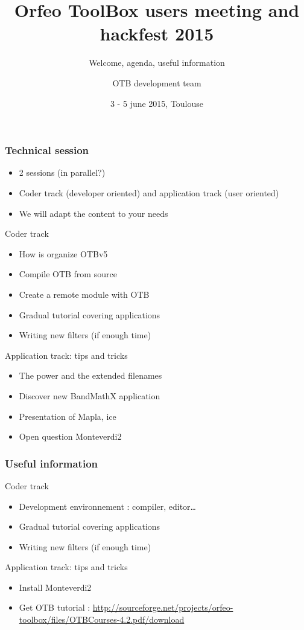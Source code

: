 \documentclass[8pt]{beamer}
\title{Orfeo ToolBox users meeting and hackfest 2015}
\subtitle{Welcome, agenda, useful information}
\author{OTB development team}%
\date{3 - 5 june 2015, Toulouse}
\begin{document}
\begin{frame}
\titlepage
\end{frame}

\begin{frame}
\frametitle{Technical session}
\begin{itemize}
\item 2 sessions (in parallel?)
\item Coder track (developer oriented) and application track (user oriented)
\item We will adapt the content to your needs 
\end{itemize}

\begin{block}{Coder track}
\begin{itemize}
\item How is organize OTBv5
\item Compile OTB from source
\item Create a remote module with OTB
\item Gradual tutorial covering applications 
\item Writing new filters (if enough time)
\end{itemize} 
\end{block}

\begin{block}{Application track: tips and tricks}
\begin{itemize}
\item The power and the extended filenames
\item Discover new BandMathX application
\item Presentation of Mapla, ice
\item Open question Monteverdi2
\end{itemize} 
\end{block}

\end{frame}

\begin{frame}
\frametitle{Useful information}
\begin{block}{Coder track}
\begin{itemize}
\item Development environnement : compiler, editor\ldots
\item Gradual tutorial covering applications 
\item Writing new filters (if enough time)
\end{itemize} 
\end{block}

\begin{block}{Application track: tips and tricks}
\begin{itemize}
\item Install Monteverdi2   
\item Get OTB tutorial : \href{http://sourceforge.net/projects/orfeo-toolbox/files/OTBCourses-4.2.pdf/download}{http://sourceforge.net/projects/orfeo-toolbox/files/OTBCourses-4.2.pdf/download}
\end{itemize} 
\end{block}

\end{frame}
\end{document}
